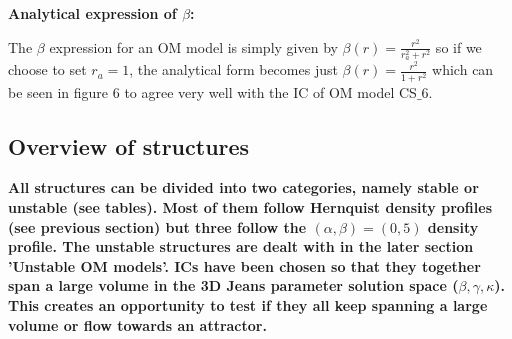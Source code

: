\centerline{\textbf{Analytical expression of $\beta$:}}
The $\beta$ expression for an OM model is simply given by $\beta(r)=\frac{r^2}{r_a^2+r^2}$ so if we choose to set $r_a = 1$, the analytical form becomes just $\beta(r)=\frac{r^2}{1+r^2}$ which can be seen in figure 6 to agree very well with the IC of OM model CS$\_$6.

\subsection{Overview of structures}
\textbf{All structures can be divided into two categories, namely stable or unstable (see tables). Most of them follow Hernquist density profiles (see previous section) but three follow the $(\alpha, \beta) = (0,5)$ density profile. The unstable structures are dealt with in the later section 'Unstable OM models'. ICs have been chosen so that they together span a large volume in the 3D Jeans parameter solution space ($\beta, \gamma, \kappa$). This creates an opportunity to test if they all keep spanning a large volume or flow towards an attractor.} \\ 

